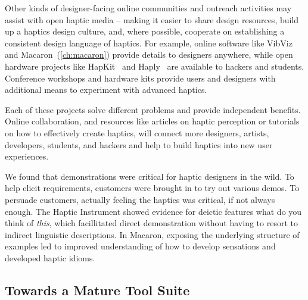     Other kinds of designer-facing online communities and outreach activities may assist with open haptic media -- making it easier to share design resources,  build up a haptics design culture, and, where possible, cooperate on establishing a consistent design language of haptics. 
%
    For example, online software like VibViz~\cite{Seifi2015} and Macaron~(\autoref{ch:macaron}) provide details to designers anywhere, while open hardware projects like HapKit~\cite{Martinez2016} and Haply~\cite{Gallacher2016} are available to hackers and students.
    Conference workshops and hardware kits provide users and designers with additional means to experiment with advanced haptics.
    
    Each of these projects solve different problems and provide independent benefits.
    Online collaboration, and resources like articles on haptic perception or tutorials on how to effectively create haptics, will connect more designers, artists, developers, students, and hackers and help to build haptics into new user experiences.


We found that demonstrations were critical for haptic designers in the wild.
To help elicit requirements, customers were brought in to try out various demos.
To persuade customers, actually feeling the haptics was critical, if not always enough.
The Haptic Instrument showed evidence for deictic features what do you think of \emph{this}, which facillitated direct demonstration without having to resort to indirect linguistic descriptions.
In Macaron, exposing the underlying structure of examples led to improved understanding of how to develop sensations and developed haptic idioms.


%
%
\subsection{Towards a Mature \haxd Tool Suite}
\label{sec:conclusion:maturetoolsuite}



